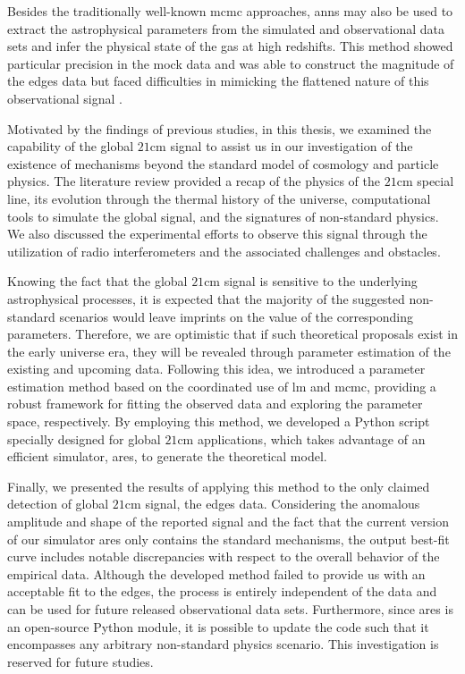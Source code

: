 \documentclass[12pt, TexShade, letterpaper]{report}
\begin{document}
Besides the traditionally well-known \gls{mcmc} approaches, \gls{ann}s may also be used to extract the astrophysical parameters from the simulated and observational data sets and infer the physical state of the gas at high redshifts. This method showed particular precision in the mock data and was able to construct the magnitude of the \gls{edges} data but faced difficulties in mimicking the flattened nature of this observational signal \cite{pe_nn_1}.\par

Motivated by the findings of previous studies, in this thesis, we examined the capability of the global $\mathrm{21cm}$ signal to assist us in our investigation of the existence of mechanisms beyond the standard model of cosmology and particle physics. The literature review provided a recap of the physics of the $\mathrm{21cm}$ special line, its evolution through the thermal history of the universe, computational tools to simulate the global signal, and the signatures of non-standard physics. We also discussed the experimental efforts to observe this signal through the utilization of radio interferometers and the associated challenges and obstacles.\par

Knowing the fact that the global $\mathrm{21cm}$ signal is sensitive to the underlying astrophysical processes, it is expected that the majority of the suggested non-standard scenarios would leave imprints on the value of the corresponding parameters. Therefore, we are optimistic that if such theoretical proposals exist in the early universe era, they will be revealed through parameter estimation of the existing and upcoming data. Following this idea, we introduced a parameter estimation method based on the coordinated use of \gls{lm} and \gls{mcmc}, providing a robust framework for fitting the observed data and exploring the parameter space, respectively. By employing this method, we developed a Python script specially designed for global $\mathrm{21cm}$ applications, which takes advantage of an efficient simulator, \gls{ares}, to generate the theoretical model.\par

Finally, we presented the results of applying this method to the only claimed detection of global $\mathrm{21cm}$ signal, the \gls{edges} data. Considering the anomalous amplitude and shape of the reported signal and the fact that the current version of our simulator \gls{ares} only contains the standard mechanisms, the output best-fit curve includes notable discrepancies with respect to the overall behavior of the empirical data. Although the developed method failed to provide us with an acceptable fit to the \gls{edges}, the process is entirely independent of the data and can be used for future released observational data sets. Furthermore, since \gls{ares} is an open-source Python module, it is possible to update the code such that it encompasses any arbitrary non-standard physics scenario. This investigation is reserved for future studies.\par
\end{document}
